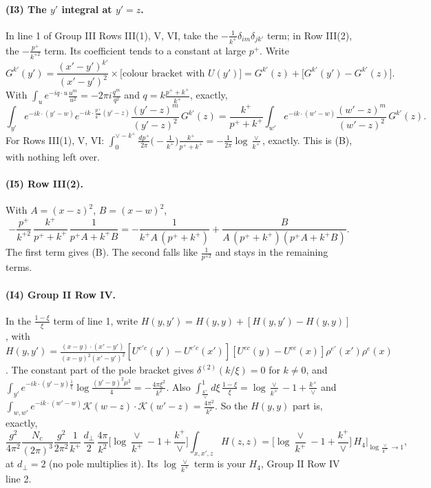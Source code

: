 \documentclass[10pt]{article}
\numberwithin{equation}{section}
\begin{document}
\paragraph{(I3) The $y'$ integral at $y'=z$.} In line 1 of Group III Rows III(1), V, VI, take the $-\frac{1}{k^+}\delta_{im}\delta_{jk'}$ term; in Row III(2), the $-\frac{p^+}{k^{+2}}$ term. Its coefficient tends to a constant at large $p^+$. Write
\begin{equation*}
G^{k'}(y')=\frac{(x'-y')^{k'}}{(x'-y')^2}\times\big[\text{colour bracket with }U(y')\big]=G^{k'}(z)+\big[G^{k'}(y')-G^{k'}(z)\big].
\end{equation*}
With $\int_u e^{-iq\cdot u}\frac{u^m}{u^2}=-2\pi i\frac{q^m}{q^2}$ and $q=k\frac{p^++k^+}{k^+}$, exactly,
\begin{equation}
\int_{y'}e^{-ik\cdot(y'-w)}e^{-ik\cdot\frac{p^+}{k^+}(y'-z)}\frac{(y'-z)^m}{(y'-z)^2}\,G^{k'}(z)=\frac{k^+}{p^++k^+}\int_{w'}e^{-ik\cdot(w'-w)}\frac{(w'-z)^m}{(w'-z)^2}\,G^{k'}(z).
\label{eq:I3}
\end{equation}
For Rows III(1), V, VI: $\int_0^{\vee-k^+}\frac{dp^+}{2\pi}\big(-\frac{1}{k^+}\big)\frac{k^+}{p^++k^+}=-\frac{1}{2\pi}\log\frac{\vee}{k^+}$, exactly. This is (B), with nothing left over.

\paragraph{(I5) Row III(2).} With $A=(x-z)^2$, $B=(x-w)^2$,
\begin{equation}
-\frac{p^+}{k^{+2}}\,\frac{k^+}{p^++k^+}\,\frac{1}{p^+A+k^+B}=-\frac{1}{k^+A\,(p^++k^+)}+\frac{B}{A\,(p^++k^+)(p^+A+k^+B)}.
\label{eq:I5}
\end{equation}
The first term gives (B). The second falls like $\frac{1}{p^{+2}}$ and stays in the remaining terms.

\paragraph{(I4) Group II Row IV.} In the $\frac{1-\xi}{\xi}$ term of line 1, write $H(y,y')=H(y,y)+[H(y,y')-H(y,y)]$, with $H(y,y')=\frac{(x-y)\cdot(x'-y')}{(x-y)^2(x'-y')^2}[U^{e'c}(y')-U^{e'c}(x')][U^{ec}(y)-U^{ce}(x)]\rho^{e'}(x')\rho^e(x)$. The constant part of the pole bracket gives $\delta^{(2)}(k/\xi)=0$ for $k\neq0$, and $\int_{y'}e^{-ik\cdot(y'-y)\frac{1}{\xi}}\log\frac{(y'-y)^2\mu^2}{4}=-\frac{4\pi\xi^2}{k^2}$. Also $\int_{\frac{k^+}{\vee}}^1d\xi\,\frac{1-\xi}{\xi}=\log\frac{\vee}{k^+}-1+\frac{k^+}{\vee}$ and $\int_{w,w'}e^{-ik\cdot(w'-w)}\mathcal K(w-z)\cdot\mathcal K(w'-z)=\frac{4\pi^2}{k^2}$. So the $H(y,y)$ part is, exactly,
\begin{equation}
\frac{g^2}{4\pi^2}\frac{N_c}{(2\pi)^3}\frac{g^2}{2\pi^2}\frac{1}{k^+}\,\frac{d_\perp}{2}\,\frac{4\pi}{k^2}\Big[\log\frac{\vee}{k^+}-1+\frac{k^+}{\vee}\Big]\int_{x,x',z}H(z,z)
=\Big[\log\frac{\vee}{k^+}-1+\frac{k^+}{\vee}\Big]\,H_4\Big|_{\log\frac{\vee}{k^+}\to1},
\label{eq:I4}
\end{equation}
at $d_\perp=2$ (no pole multiplies it). Its $\log\frac{\vee}{k^+}$ term is your $H_4$, Group II Row IV line 2.
\end{document}
